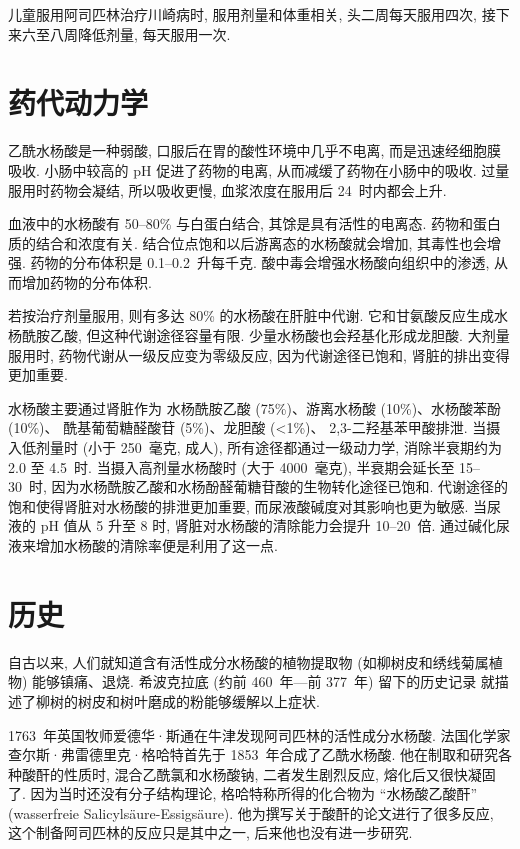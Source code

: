 儿童服用阿司匹林治疗川崎病时, 服用剂量和体重相关,
头二周每天服用四次, 接下来六至八周降低剂量, 每天服用一次.

\section{药代动力学}

乙酰水杨酸是一种弱酸,
口服后在胃的酸性环境中几乎不电离,
而是迅速经细胞膜吸收.
小肠中较高的 pH 促进了药物的电离,
从而减缓了药物在小肠中的吸收.
过量服用时药物会凝结, 所以吸收更慢,
血浆浓度在服用后 24~时内都会上升.

血液中的水杨酸有 50--80\% 与白蛋白结合,
其馀是具有活性的电离态.
药物和蛋白质的结合和浓度有关.
结合位点饱和以后游离态的水杨酸就会增加, 其毒性也会增强.
药物的分布体积是 0.1--0.2~升每千克.
酸中毒会增强水杨酸向组织中的渗透, 从而增加药物的分布体积.

若按治疗剂量服用, 则有多达 80\% 的水杨酸在肝脏中代谢.
它和甘氨酸反应生成水杨酰胺乙酸, 但这种代谢途径容量有限.
少量水杨酸也会羟基化形成龙胆酸.
大剂量服用时, 药物代谢从一级反应变为零级反应,
因为代谢途径已饱和, 肾脏的排出变得更加重要.

水杨酸主要通过肾脏作为%
水杨酰胺乙酸 (75\%)、游离水杨酸 (10\%)、水杨酸苯酚 (10\%)、%
酰基葡萄糖醛酸苷 (5\%)、龙胆酸 (<1\%)、 2,3-二羟基苯甲酸排泄.
当摄入低剂量时 (小于 250~毫克, 成人),
所有途径都通过一级动力学, 消除半衰期约为 2.0 至 4.5~时.
当摄入高剂量水杨酸时 (大于 \num{4000}~毫克),
半衰期会延长至 15--30~时,
因为水杨酰胺乙酸和水杨酚醛葡糖苷酸的生物转化途径已饱和.
代谢途径的饱和使得肾脏对水杨酸的排泄更加重要,
而尿液酸碱度对其影响也更为敏感.
当尿液的 pH 值从 5 升至 8 时,
肾脏对水杨酸的清除能力会提升 10--20~倍.
通过碱化尿液来增加水杨酸的清除率便是利用了这一点.

\section{历史}

自古以来, 人们就知道含有活性成分水杨酸的植物提取物
(如柳树皮和绣线菊属植物) 能够镇痛、退烧.
希波克拉底 (约前 460~年—前 377~年) 留下的历史记录%
就描述了柳树的树皮和树叶磨成的粉能够缓解以上症状.

1763~年英国牧师爱德华·斯通在牛津发现阿司匹林的活性成分水杨酸.
法国化学家查尔斯·弗雷德里克·格哈特首先于 1853~年合成了乙酰水杨酸.
他在制取和研究各种酸酐的性质时, 混合乙酰氯和水杨酸钠,
二者发生剧烈反应, 熔化后又很快凝固了.
因为当时还没有分子结构理论, 格哈特称所得的化合物为
``水杨酸乙酸酐''
(wasserfreie Salicyls\"aure-Essigs\"aure).
他为撰写关于酸酐的论文进行了很多反应,
这个制备阿司匹林的反应只是其中之一, 后来他也没有进一步研究.

